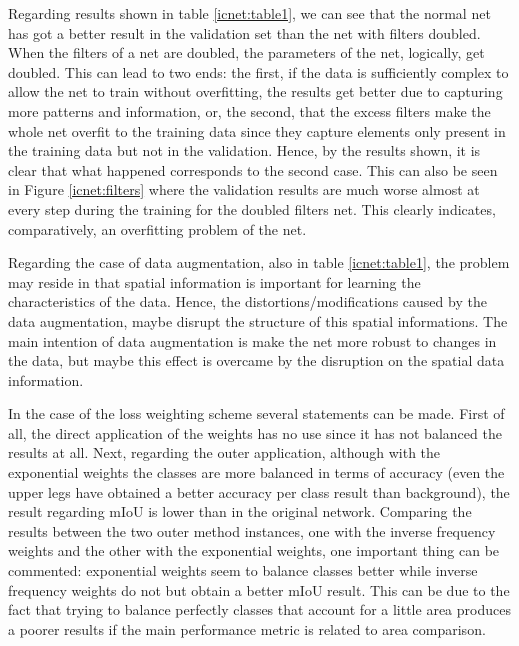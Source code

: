 Regarding results shown in table \ref{icnet:table1}, we can see that the normal net has got a better result in the validation set than the net with filters doubled. When the filters of a net are doubled, the parameters of the net, logically, get doubled. This can lead to two ends: the first, if the data is sufficiently complex to allow the net to train without overfitting, the results get better due to capturing more patterns and information, or, the second, that the excess filters make the whole net overfit to the training data since they capture elements only present in the training data but not in the validation. Hence, by the results shown, it is clear that what happened corresponds to the second case. This can also be seen in Figure \ref{icnet:filters} where the validation results are much worse almost at every step during the training for the doubled filters net. This clearly indicates, comparatively, an overfitting problem of the net.\newline

Regarding the case of data augmentation, also in table \ref{icnet:table1}, the problem may reside in that spatial information is important for learning the characteristics of the data. Hence, the distortions/modifications caused by the data augmentation, maybe disrupt the structure of this spatial informations. The main intention of data augmentation is make the net more robust to changes in the data, but maybe this effect is overcame by the disruption on the spatial data information.\newline

In the case of the loss weighting scheme several statements can be made. First of all, the direct application of the weights has no use since it has not balanced the results at all. Next, regarding the outer application, although with the exponential weights the classes are more balanced in terms of accuracy (even the upper legs have obtained a better accuracy per class result than background), the result regarding mIoU is lower than in the original network. Comparing the results between the two outer method instances, one with the inverse frequency weights and the other with the exponential weights, one important thing can be commented: exponential weights seem to balance classes better while inverse frequency weights do not but obtain a better mIoU result. This can be due to the fact that trying to balance perfectly classes that account for a little area produces a poorer results if the main performance metric is related to area comparison.\newline

